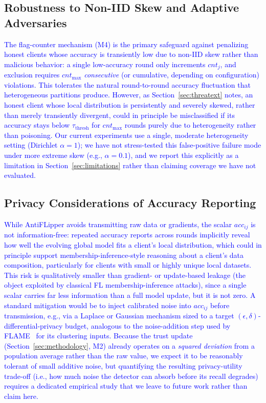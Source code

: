 \documentclass[conference]{IEEEtran}
\begin{document}
\subsection{Robustness to Non-IID Skew and Adaptive Adversaries}
\textcolor{blue}{The flag-counter mechanism (M4) is the primary safeguard against penalizing honest clients whose accuracy is transiently low due to non-IID skew rather than malicious behavior: a single low-accuracy round only increments $cnt_j$, and exclusion requires $cnt_{\max}$ \emph{consecutive} (or cumulative, depending on configuration) violations. This tolerates the natural round-to-round accuracy fluctuation that heterogeneous partitions produce. However, as Section~\ref{sec:threatext} notes, an honest client whose local distribution is persistently and severely skewed, rather than merely transiently divergent, could in principle be misclassified if its accuracy stays below $\tau_{\text{thresh}}$ for $cnt_{\max}$ rounds purely due to heterogeneity rather than poisoning. Our current experiments use a single, moderate heterogeneity setting (Dirichlet $\alpha=1$); we have not stress-tested this false-positive failure mode under more extreme skew (e.g., $\alpha=0.1$), and we report this explicitly as a limitation in Section~\ref{sec:limitations} rather than claiming coverage we have not evaluated.}

\subsection{Privacy Considerations of Accuracy Reporting}
\textcolor{blue}{While AntiFLipper avoids transmitting raw data or gradients, the scalar $acc_{ij}$ is not information-free: repeated accuracy reports across rounds implicitly reveal how well the evolving global model fits a client's local distribution, which could in principle support membership-inference-style reasoning about a client's data composition, particularly for clients with small or highly unique local datasets. This risk is qualitatively smaller than gradient- or update-based leakage (the object exploited by classical FL membership-inference attacks), since a single scalar carries far less information than a full model update, but it is not zero. A standard mitigation would be to inject calibrated noise into $acc_{ij}$ before transmission, e.g., via a Laplace or Gaussian mechanism sized to a target $(\epsilon,\delta)$-differential-privacy budget, analogous to the noise-addition step used by FLAME~\cite{nguyen2022flame} for its clustering inputs. Because the trust update (Section~\ref{sec:methodology}, M2) already operates on a \emph{squared deviation} from a population average rather than the raw value, we expect it to be reasonably tolerant of small additive noise, but quantifying the resulting privacy-utility trade-off (i.e., how much noise the detector can absorb before its recall degrades) requires a dedicated empirical study that we leave to future work rather than claim here.}
\end{document}
